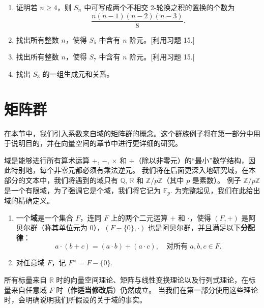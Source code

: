 \begin{enumerate}
\item 证明若 \( n \geq 4 \)，则 \( S_n \) 中可写成两个不相交 2-轮换之积的置换的个数为
\[
\frac{n(n-1)(n-2)(n-3)}{8}.
\]

\item 找出所有整数 \( n \)，使得 \( S_5 \) 中含有 \( n \) 阶元。[利用习题 15.]

\item 找出所有整数 \( n \)，使得 \( S_7 \) 中含有 \( n \) 阶元。[利用习题 15.]

\item 找出 \( S_3 \) 的一组生成元和关系。

\end{enumerate}

\section{矩阵群}

在本节中，我们引入系数来自域的矩阵群的概念。这个群族例子将在第一部分中用于说明目的，并在向量空间的章节中进行更详细的研究。

域是能够进行所有算术运算 \( + \), \( - \), \( \times \) 和 \( \div \)（除以非零元）的“最小”数学结构，因此特别地，每个非零元都必须有乘法逆元。
我们将在后面更深入地研究域，在本部分的文本中，我们将遇到的域只有 \( \mathbb{Q} \), \( \mathbb{R} \) 和 \( \mathbb{Z}/p\mathbb{Z} \)（其中 \( p \) 是素数）。
例子 \( \mathbb{Z}/p\mathbb{Z} \) 是一个有限域，为了强调它是个域，我们将它记为 \( \mathbb{F}_p \). 
为完整起见，我们在此给出域的精确定义。

\begin{definition}
\begin{enumerate}
\item 一个\textbf{域}是一个集合 \( F \)，连同 \( F \) 上的两个二元运算 \(+\) 和 \(\cdot\)，使得 \((F, +)\) 是阿贝尔群（称其单位元为 0），\((F - \{0\}, \cdot)\) 也是阿贝尔群，并且满足以下\textbf{分配律}：
\[
a \cdot (b + c) = (a \cdot b) + (a \cdot c), \quad \text{对所有 } a, b, c \in F.
\]
\item 对任意域 \( F \)，记 \( F^\times = F - \{0\} \).
\end{enumerate}
\end{definition}

所有标量来自 \(\mathbb{R}\) 时的向量空间理论、矩阵与线性变换理论以及行列式理论，在标量来自任意域 \( F \) 时（\textbf{作适当修改后}）仍然成立。
当我们在第一部分使用这些理论时，会明确说明我们所假设的关于域的事实。

